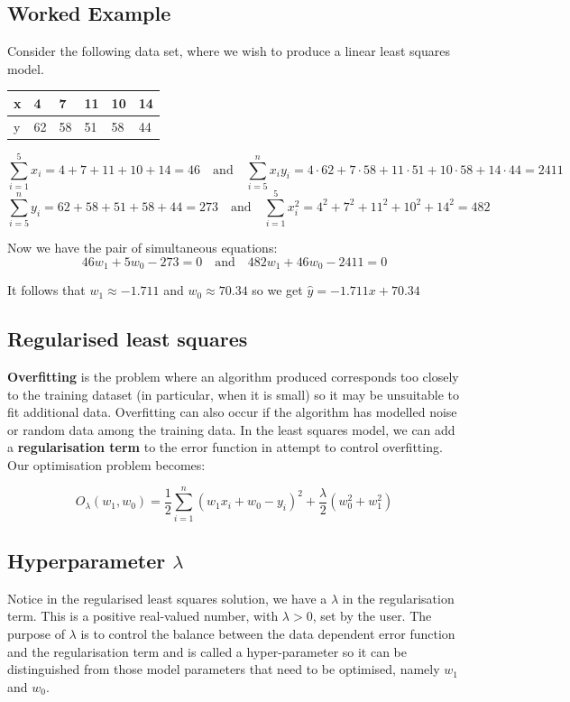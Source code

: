 \documentclass[11pt,fleqn]{book} %
\begin{document}
\subsection*{Worked Example}
Consider the following data set, where we wish to produce a linear least squares model.
\begin{table}[h]
\centering
\begin{tabular}{l|lllll}
x & 4  & 7  & 11 & 10 & 14 \\ \hline
y & 62 & 58 & 51 & 58 & 44
\end{tabular}
\end{table}
$$ \sum^5_{i=1} x_i = 4 + 7 + 11 + 10 + 14 = 46 \quad \text{and} \quad \sum^n_{i=5} x_iy_i = 4 \cdot 62 + 7 \cdot 58 + 11 \cdot 51 + 10 \cdot 58 + 14 \cdot 44 = 2411$$
$$ \sum^n_{i=5} y_i = 62 + 58 + 51 + 58 + 44 = 273 \quad \text{and} \quad \sum^5_{i=1} x_i^2 = 4^2 + 7^2 + 11^2 + 10^2 + 14^2 = 482$$

\noindent
Now we have the pair of simultaneous equations:
$$46w_1 + 5w_0 - 273 = 0 \quad \text{and} \quad 482w_1 + 46w_0 - 2411 = 0$$

\noindent
It follows that $w_1 \approx -1.711$ and $w_0 \approx 70.34$ so we get $\hat{y} = -1.711x + 70.34$

\subsection{Regularised least squares}
\textbf{Overfitting} is the problem where an algorithm produced corresponds too closely to the training dataset (in particular, when it is small) so it may be unsuitable to fit additional data. Overfitting can also occur if the algorithm has modelled noise or random data among the training data. In the least squares model, we can add a \textbf{regularisation term} to the error function in attempt to control overfitting. Our optimisation problem becomes:

$$O_\lambda (w_1, w_0) = \frac{1}{2}\sum^n_{i = 1}(w_1x_i + w_0 - y_i)^2 + \frac{\lambda}{2}(w_0^2 + w_1^2)$$

\subsection*{Hyperparameter $\lambda$}
Notice in the regularised least squares solution, we have a $\lambda$ in the regularisation term. This is a positive real-valued number, with $\lambda > 0$, set by the user. The purpose of $\lambda$ is to control the balance between the data dependent error function and the regularisation term and is called a hyper-parameter so it can be distinguished from those model parameters that need to be optimised, namely $w_1$ and $w_0$.
\end{document}
